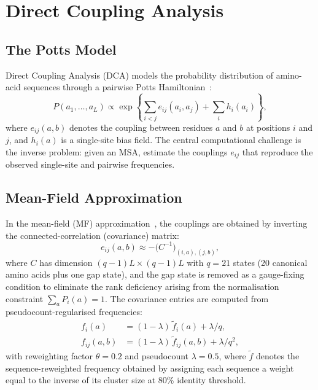 \section{Direct Coupling Analysis}
\label{sec:theory-dca}

\subsection{The Potts Model}
Direct Coupling Analysis (DCA) models the probability distribution of amino-acid
sequences through a pairwise Potts Hamiltonian~\cite{weigt2009,morcos2011}:
\begin{equation}
	P(a_1, \ldots, a_L) \propto
	\exp\!\left\{
	\sum_{i<j} e_{ij}(a_i, a_j) + \sum_i h_i(a_i)
	\right\},
	\label{eq:potts}
\end{equation}
where $e_{ij}(a,b)$ denotes the coupling between residues $a$ and $b$ at
positions $i$ and $j$, and $h_i(a)$ is a single-site bias field.  The central
computational challenge is the inverse problem: given an MSA, estimate the
couplings $e_{ij}$ that reproduce the observed single-site and pairwise
frequencies.

\subsection{Mean-Field Approximation}
In the mean-field (MF) approximation~\cite{morcos2011}, the couplings are
obtained by inverting the connected-correlation (covariance) matrix:
\begin{equation}
	e_{ij}(a,b) \approx -\bigl(C^{-1}\bigr)_{(i,a),(j,b)},
	\label{eq:mf-coupling}
\end{equation}
where $C$ has dimension $(q{-}1)L \times (q{-}1)L$ with $q = 21$ states
(20 canonical amino acids plus one gap state), and the gap state is removed as
a gauge-fixing condition to eliminate the rank deficiency arising from the
normalisation constraint $\sum_a P_i(a) = 1$.  The covariance entries are
computed from pseudocount-regularised frequencies:
\begin{align}
	f_i(a)      & = (1-\lambda)\,\tilde{f}_i(a) + \lambda / q,        \\
	f_{ij}(a,b) & = (1-\lambda)\,\tilde{f}_{ij}(a,b) + \lambda / q^2,
	\label{eq:pseudocount}
\end{align}
with reweighting factor $\theta = 0.2$ and pseudocount $\lambda = 0.5$, where
$\tilde{f}$ denotes the sequence-reweighted frequency obtained by assigning
each sequence a weight equal to the inverse of its cluster size at 80\%
identity threshold.

